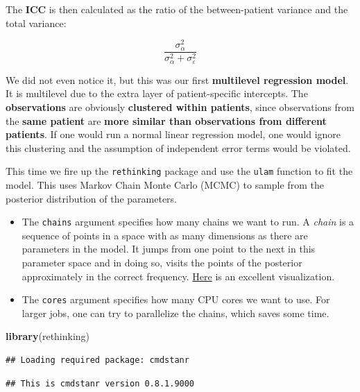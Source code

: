 \documentclass[
]{article}
\newenvironment{Shaded}{\begin{snugshade}}{\end{snugshade}}
\newcommand{\FunctionTok}[1]{\textcolor[rgb]{0.13,0.29,0.53}{\textbf{#1}}}
\newcommand{\NormalTok}[1]{#1}
\begin{document}
The \textbf{ICC} is then calculated as the ratio of the between-patient variance and
the total variance:

\[\frac{\sigma_{\alpha}^2}{\sigma_{\alpha}^2 + \sigma_{\varepsilon}^2}\]

We did not even notice it, but this was our first \textbf{multilevel regression model}.
It is multilevel due to the extra layer of patient-specific intercepts.
The \textbf{observations} are obviously \textbf{clustered within patients}, since observations
from the \textbf{same patient} are \textbf{more similar than observations from different patients}.
If one would run a normal linear regression model, one would ignore this clustering
and the assumption of independent error terms would be violated.

This time we fire up the \texttt{rethinking} package and use the \texttt{ulam} function
to fit the model.
This uses Markov Chain Monte Carlo (MCMC) to sample from the posterior
distribution of the parameters.

\begin{itemize}
\item
  The \texttt{chains} argument specifies how many chains we want to run.
  A \emph{chain} is a sequence of points in a space with as many dimensions as there
  are parameters in the model. It jumps from one point to the next in this parameter
  space and in doing so, visits the points of the posterior approximately in the correct
  frequency. \href{https://blog.revolutionanalytics.com/2013/09/an-animated-peek-into-the-workings-of-bayesian-statistics.html}{Here}
  is an excellent visualization.
\item
  The \texttt{cores} argument specifies how many CPU cores we want to use.
  For larger jobs, one can try to parallelize
  the chains, which saves some time.
\end{itemize}

\begin{Shaded}
\begin{Highlighting}[]
\FunctionTok{library}\NormalTok{(rethinking)}
\end{Highlighting}
\end{Shaded}

\begin{verbatim}
## Loading required package: cmdstanr
\end{verbatim}

\begin{verbatim}
## This is cmdstanr version 0.8.1.9000
\end{verbatim}
\end{document}
